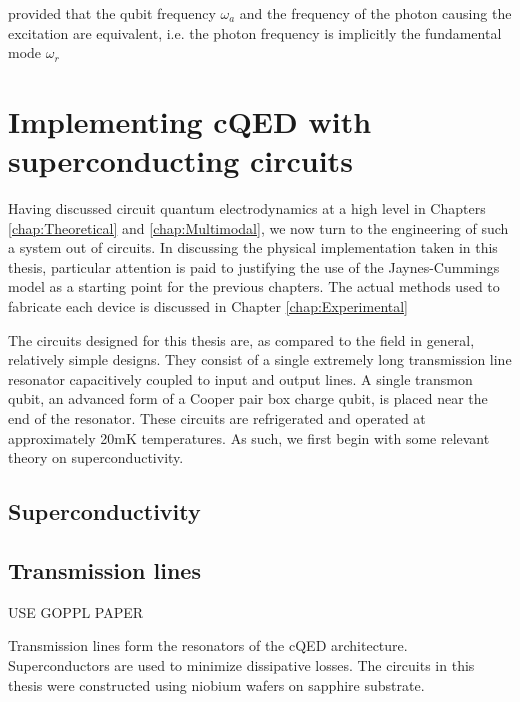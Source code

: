 \documentclass[12 pt]{book}
\begin{document}
provided that the qubit frequency $\omega_a$ and the frequency of the photon causing the excitation are equivalent, i.e. the photon frequency is implicitly the fundamental mode $\omega_r$


\chapter{Implementing cQED with superconducting circuits}\label{chap:Implementing}
Having discussed circuit quantum electrodynamics at a high level in Chapters \ref{chap:Theoretical} and \ref{chap:Multimodal}, we now turn to the engineering of such a system out of circuits. In discussing the physical implementation taken in this thesis, particular attention is paid to justifying the use of the Jaynes-Cummings model as a starting point for the previous chapters. The actual methods used to fabricate each device is discussed in Chapter \ref{chap:Experimental}

The circuits designed for this thesis are, as compared to the field in general, relatively simple designs. They consist of a single extremely long transmission line resonator capacitively coupled to input and output lines. A single transmon qubit, an advanced form of a Cooper pair box charge qubit, is placed near the end of the resonator. These circuits are refrigerated and operated at approximately 20mK temperatures. As such, we first begin with some relevant theory on superconductivity. 

\section{Superconductivity}

\section{Transmission lines}\label{sec:TransmissionLines}
USE GOPPL PAPER

Transmission lines form the resonators of the cQED architecture. Superconductors are used to minimize dissipative losses. The circuits in this thesis were constructed using niobium wafers on sapphire substrate.
\end{document}
